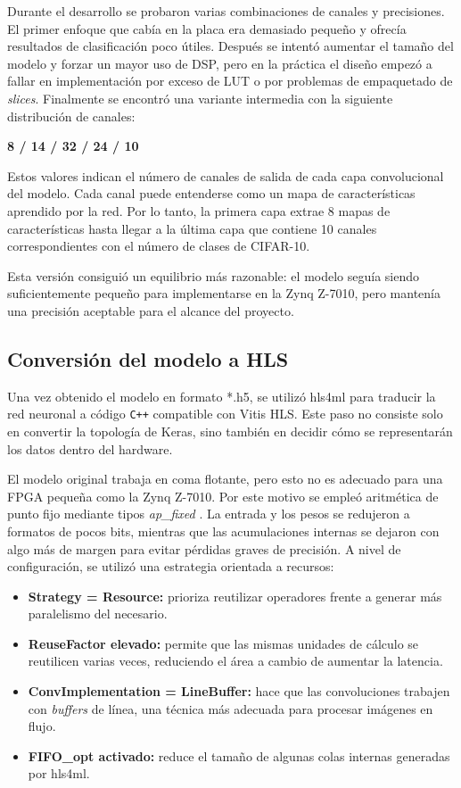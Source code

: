 Durante el desarrollo se probaron varias combinaciones de canales y precisiones.
El primer enfoque que cabía en la placa era demasiado pequeño y ofrecía resultados
de clasificación poco útiles. Después se intentó aumentar el tamaño del modelo y forzar un
mayor uso de \ac{DSP}, pero en la práctica el diseño empezó a fallar en implementación por exceso
de \ac{LUT} o por problemas de empaquetado de \textit{slices}. Finalmente se encontró una
variante intermedia con la siguiente distribución de canales:

\begin{center}
  \textbf{8 / 14 / 32 / 24 / 10}
\end{center}

Estos valores indican el número de canales de salida de cada capa convolucional del modelo.
Cada canal puede entenderse como un mapa de características aprendido por la red.
Por lo tanto, la primera capa extrae 8 mapas de características hasta llegar a la última capa
que contiene 10 canales correspondientes con el número de clases de \ac{CIFAR}-10.

Esta versión consiguió un equilibrio más razonable: el modelo seguía siendo suficientemente
pequeño para implementarse en la Zynq Z-7010, pero mantenía una precisión aceptable
para el alcance del proyecto.

\subsection{Conversión del modelo a HLS}
Una vez obtenido el modelo en formato *.h5, se utilizó hls4ml para traducir la red neuronal
a código \texttt{C++} compatible con Vitis \ac{HLS}. Este paso no consiste solo en
convertir la topología
de Keras, sino también en decidir cómo se representarán los datos dentro del hardware.

El modelo original trabaja en coma flotante, pero esto no es adecuado para una \ac{FPGA} pequeña
como la Zynq Z-7010. Por este motivo se empleó aritmética de punto fijo mediante
tipos \textit{ap\_fixed} \citep{amdPrecisionFixedPoint}.
La entrada y los pesos se redujeron a formatos de pocos bits, mientras
que las acumulaciones internas se dejaron con algo más de margen para evitar
pérdidas graves de precisión.
A nivel de configuración, se utilizó una estrategia orientada a recursos:

\begin{itemize}
  \item \textbf{Strategy = Resource:} prioriza reutilizar operadores frente a generar
    más paralelismo del necesario.
  \item \textbf{ReuseFactor elevado:} permite que las mismas unidades de cálculo se
    reutilicen varias veces, reduciendo el área a cambio de aumentar la latencia.
  \item \textbf{ConvImplementation = LineBuffer:} hace que las convoluciones trabajen con
    \textit{buffers} de línea, una técnica más adecuada para procesar imágenes en flujo.
  \item \textbf{FIFO\_opt activado:} reduce el tamaño de algunas colas internas
    generadas por hls4ml.
\end{itemize}

